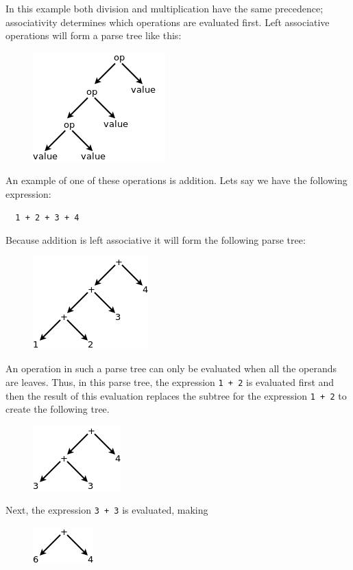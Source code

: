 \documentclass{article}
\newcommand{\code}[1]{\texttt{\textmd{#1}}}
\begin{document}
In this example both division and multiplication have the same precedence; associativity determines
which operations are evaluated first. Left associative operations will form a parse tree like this:
\begin{figure}[H]
  \centering
  \includegraphics{static/left-assoc-gen.png}
\end{figure}

An example of one of these operations is addition. Lets say we have the following expression:
\begin{lstlisting}
  1 + 2 + 3 + 4
\end{lstlisting}

Because addition is left associative it will form the following parse tree:
\begin{figure}[H]
  \centering
  \includegraphics{static/left-assoc-plus.png}
\end{figure}

An operation in such a parse tree can only be evaluated when all the operands are leaves. Thus, in
this parse tree, the expression \code{1 + 2} is evaluated first and then the result of this
evaluation replaces the subtree for the expression \code{1 + 2} to create the following tree.
\begin{figure}[H]
  \centering
  \includegraphics{static/left-assoc-plus-2.png}
\end{figure}

Next, the expression \code{3 + 3} is evaluated, making
\begin{figure}[H]
  \centering
  \includegraphics{static/left-assoc-plus-3.png}
\end{figure}
\end{document}
